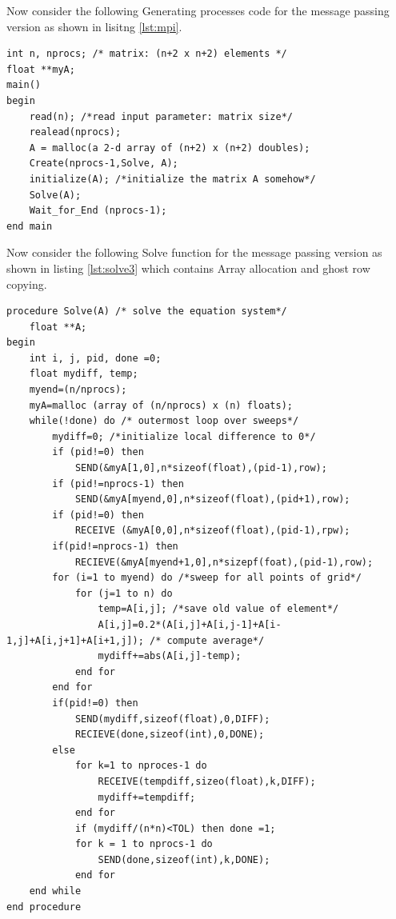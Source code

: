 \documentclass[12pt]{article}
\begin{document}
Now consider the following Generating processes code for the message passing version as shown in lisitng \ref{lst:mpi}.
\begin{lstlisting}[caption={Message Passing Version - Generating Processes},captionpos=b,label={lst:mpi}]
int n, nprocs; /* matrix: (n+2 x n+2) elements */
float **myA;
main()
begin
    read(n); /*read input parameter: matrix size*/
    realead(nprocs);
    A = malloc(a 2-d array of (n+2) x (n+2) doubles);
    Create(nprocs-1,Solve, A);
    initialize(A); /*initialize the matrix A somehow*/
    Solve(A);
    Wait_for_End (nprocs-1);
end main
\end{lstlisting}

Now consider the following Solve function for the message passing version as shown in listing \ref{lst:solve3}
which contains Array allocation and ghost row copying.
\begin{lstlisting}[caption={MPI - Solve Function},captionpos=b,label={lst:solve3}]
procedure Solve(A) /* solve the equation system*/
    float **A;
begin
    int i, j, pid, done =0;
    float mydiff, temp;
    myend=(n/nprocs);
    myA=malloc (array of (n/nprocs) x (n) floats);
    while(!done) do /* outermost loop over sweeps*/
        mydiff=0; /*initialize local difference to 0*/
        if (pid!=0) then
            SEND(&myA[1,0],n*sizeof(float),(pid-1),row);
        if (pid!=nprocs-1) then
            SEND(&myA[myend,0],n*sizeof(float),(pid+1),row);
        if (pid!=0) then
            RECEIVE (&myA[0,0],n*sizeof(float),(pid-1),rpw);
        if(pid!=nprocs-1) then
            RECIEVE(&myA[myend+1,0],n*sizepf(foat),(pid-1),row);
        for (i=1 to myend) do /*sweep for all points of grid*/
            for (j=1 to n) do
                temp=A[i,j]; /*save old value of element*/
                A[i,j]=0.2*(A[i,j]+A[i,j-1]+A[i-1,j]+A[i,j+1]+A[i+1,j]); /* compute average*/
                mydiff+=abs(A[i,j]-temp);
            end for
        end for
        if(pid!=0) then
            SEND(mydiff,sizeof(float),0,DIFF);
            RECIEVE(done,sizeof(int),0,DONE);
        else
            for k=1 to nproces-1 do
                RECEIVE(tempdiff,sizeo(float),k,DIFF);
                mydiff+=tempdiff;
            end for
            if (mydiff/(n*n)<TOL) then done =1;
            for k = 1 to nprocs-1 do
                SEND(done,sizeof(int),k,DONE);
            end for
    end while
end procedure
\end{lstlisting}
\end{document}
